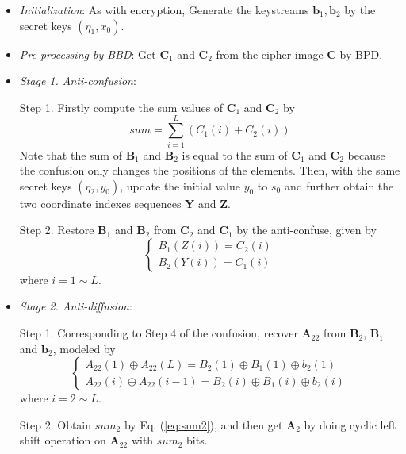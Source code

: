 \documentclass[final,3p,times,twocolumn]{elsarticle}
\begin{document}
\begin{itemize}
	
	\item \emph{Initialization}:
	As with encryption, Generate the keystreams $\bm{b}_1,\bm{b}_2$ by the secret keys $(\eta_1,x_0)$.

	\item \emph{Pre-processing by BBD}: Get $\bm{C}_1$ and $\bm{C}_2$ from the cipher image $\bm{C}$ by BPD. 
	
	\item \emph{Stage 1. Anti-confusion}:
	
	Step 1. Firstly compute the sum values of $\bm{C}_1$ and $\bm{C}_2$ by
	\begin{equation}
	sum = \sum\limits_{i= 1}^{L} (C_1(i)+C_2(i))
	\label{eq:sum_C}
	\end{equation}
	Note that the sum of $\bm{B}_1$ and $\bm{B}_2$ is equal to the sum of $\bm{C}_1$ and $\bm{C}_2$ because the confusion only changes the positions of the elements.	Then, with the same secret keys $(\eta_2,y_0)$, update the initial value $y_0$ to $s_0$ and further obtain the two coordinate indexes sequences $\bm{Y}$ and $\bm{Z}$.
	
	Step 2. Restore $\bm{B}_1$ and $\bm{B}_2$ from $\bm{C}_2$ and $\bm{C}_1$ by the anti-confuse, given by
	\begin{equation}
	\left\{ \begin{array}{l}
	B_1(Z(i)) = C_2(i)\\
    B_2(Y(i)) = C_1(i)
	\end{array} \right.
	\label{eq:anti-confusion}
	\end{equation}
	where $i=1 \sim L$. 
	
	
	\item \emph{Stage 2. Anti-diffusion}:
	
	Step 1. Corresponding to Step 4 of the confusion, recover $\bm{A}_{22}$ from $\bm{B}_{2}$, $\bm{B}_{1}$ and $\bm{b}_{2}$, modeled by
	\begin{equation}
	\left\{ \begin{array}{l}
	A_{22}(1) \oplus A_{22}(L)  = B_2(1) \oplus B_{1}(1) \oplus b_{2}(1)\\
	A_{22}(i) \oplus A_{22}(i-1) = B_2(i) \oplus B_{1}(i) \oplus b_{2}(i)
	\end{array} \right.
	\label{eq:B2_to_A22}
	\end{equation}
	where $i=2 \sim L$.
	
	Step 2. Obtain $sum_2$ by Eq. (\ref{eq:sum2}), and then get $\bm{A}_{2}$ by doing cyclic left shift operation on $\bm{A}_{22}$ with $sum_2$ bits.
	

\end{itemize}
\end{document}
